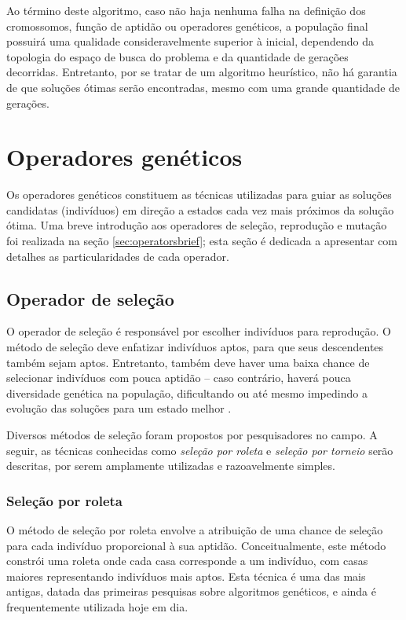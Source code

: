 \documentclass[12pt]{article}
\begin{document}
Ao término deste algoritmo, caso não haja nenhuma falha na definição dos cromossomos, função de aptidão ou operadores genéticos, a população final possuirá uma qualidade consideravelmente superior à inicial, dependendo da topologia do espaço de busca do problema e da quantidade de gerações decorridas. Entretanto, por se tratar de um algoritmo heurístico, não há garantia de que soluções ótimas serão encontradas, mesmo com uma grande quantidade de gerações.

\section{Operadores genéticos} \label{sec:geneticoperators}

Os operadores genéticos constituem as técnicas utilizadas para guiar as soluções candidatas (indivíduos) em direção a estados cada vez mais próximos da solução ótima. Uma breve introdução aos operadores de seleção, reprodução e mutação foi realizada na seção \ref{sec:operatorsbrief}; esta seção é dedicada a apresentar com detalhes as particularidades de cada operador.

\subsection{Operador de seleção}

O operador de seleção é responsável por escolher indivíduos para reprodução. O método de seleção deve enfatizar indivíduos aptos, para que seus descendentes também sejam aptos. Entretanto, também deve haver uma baixa chance de selecionar indivíduos com pouca aptidão -- caso contrário, haverá pouca diversidade genética na população, dificultando ou até mesmo impedindo a evolução das soluções para um estado melhor \cite{Mitchell1998}.

Diversos métodos de seleção foram propostos por pesquisadores no campo. A seguir, as técnicas conhecidas como \textit{seleção por roleta} e \textit{seleção por torneio} serão descritas, por serem amplamente utilizadas e razoavelmente simples.

\subsubsection{Seleção por roleta} \label{sec:roulette}

O método de seleção por roleta envolve a atribuição de uma chance de seleção para cada indivíduo proporcional à sua aptidão. Conceitualmente, este método constrói uma roleta onde cada casa corresponde a um indivíduo, com casas maiores representando indivíduos mais aptos. Esta técnica é uma das mais antigas, datada das primeiras pesquisas sobre algoritmos genéticos, e ainda é frequentemente utilizada hoje em dia.
\end{document}
